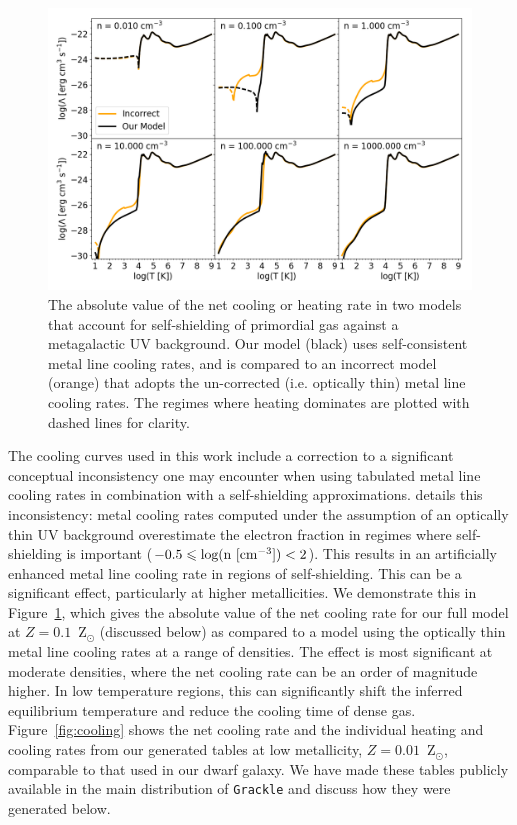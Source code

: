 \documentclass[fleqn,usenatbib,useAMS]{mnras}
\begin{document}
\begin{figure}
\centering
\includegraphics[width=0.95\linewidth]{cooling_model_comparison}
\caption{The absolute value of the net cooling or heating rate in two models that account for self-shielding of primordial gas against a metagalactic UV background. Our model (black) uses self-consistent metal line cooling rates, and is compared to an incorrect model (orange) that adopts the un-corrected (i.e. optically thin) metal line cooling rates. The regimes where heating dominates are plotted with dashed lines for clarity.}
\label{fig:cooling comparison}
\end{figure}


The cooling curves used in this work include a correction to a significant conceptual inconsistency one may encounter when using tabulated metal line cooling rates in combination with a self-shielding approximations. \citet{Hu2017} details this inconsistency: metal cooling rates computed under the assumption of an optically thin UV background overestimate the electron fraction in regimes where self-shielding is important ($-0.5 \leq \rm{log(n~[cm^{-3}])} < 2$). This results in an artificially enhanced metal line cooling rate in regions of self-shielding. This can be a significant effect, particularly at higher metallicities. We demonstrate this in Figure~\ref{fig:cooling comparison}, which gives the absolute value of the net cooling rate for our full model at $Z = 0.1$~Z$_{\odot}$ (discussed below) as compared to a model using the optically thin metal line cooling rates at a range of densities. The effect is most significant at moderate densities, where the net cooling rate can be an order of magnitude higher. In low temperature regions, this can significantly shift the inferred equilibrium temperature and reduce the cooling time of dense gas. Figure~\ref{fig:cooling} shows the net cooling rate and the individual heating and cooling rates from our generated tables at low metallicity, $Z = 0.01$~Z$_{\odot}$, comparable to that used in our dwarf galaxy. We have made these tables publicly available in the main distribution of \texttt{Grackle} and discuss how they were generated below.
\end{document}
